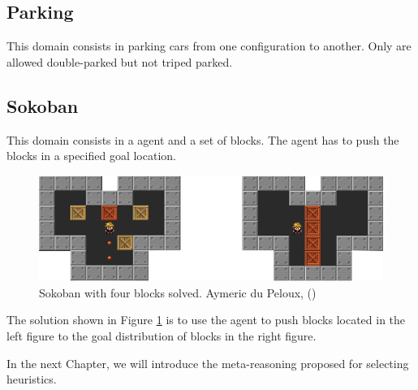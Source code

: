 \subsection{Parking}
This domain consists in parking cars from one configuration to another. Only are allowed double-parked but not triped parked.

\subsection{Sokoban}
This domain consists in a agent and a set of blocks. The agent has to push the blocks in a specified goal location.

\begin{figure}[!htb]
\begin{center}
  \includegraphics[width=12cm,scale=0.5]{images/sokoban_star_end}
\end{center}
\caption{Sokoban with four blocks solved. Aymeric du Peloux, (\citeyear{sokoban2010})}\label{fig:img_sokoban_solved}
\end{figure}

The solution shown in Figure \ref{fig:img_sokoban_solved} is to use the agent to push blocks located in the left figure to the goal distribution of blocks in the right figure.

\bigskip

In the next Chapter, we will introduce the meta-reasoning proposed for selecting heuristics.

\clearpage